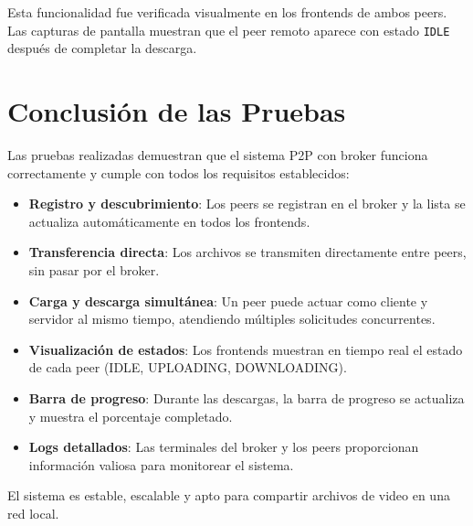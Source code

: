 \documentclass[12pt]{article}
\begin{document}
Esta funcionalidad fue verificada visualmente en los frontends de ambos peers. Las capturas de pantalla muestran que el peer remoto aparece con estado \texttt{IDLE} después de completar la descarga.

\section{Conclusión de las Pruebas}

Las pruebas realizadas demuestran que el sistema P2P con broker funciona correctamente y cumple con todos los requisitos establecidos:

\begin{itemize}
    \item \textbf{Registro y descubrimiento}: Los peers se registran en el broker y la lista se actualiza automáticamente en todos los frontends.
    \item \textbf{Transferencia directa}: Los archivos se transmiten directamente entre peers, sin pasar por el broker.
    \item \textbf{Carga y descarga simultánea}: Un peer puede actuar como cliente y servidor al mismo tiempo, atendiendo múltiples solicitudes concurrentes.
    \item \textbf{Visualización de estados}: Los frontends muestran en tiempo real el estado de cada peer (IDLE, UPLOADING, DOWNLOADING).
    \item \textbf{Barra de progreso}: Durante las descargas, la barra de progreso se actualiza y muestra el porcentaje completado.
    \item \textbf{Logs detallados}: Las terminales del broker y los peers proporcionan información valiosa para monitorear el sistema.
\end{itemize}

El sistema es estable, escalable y apto para compartir archivos de video en una red local.
\end{document}
